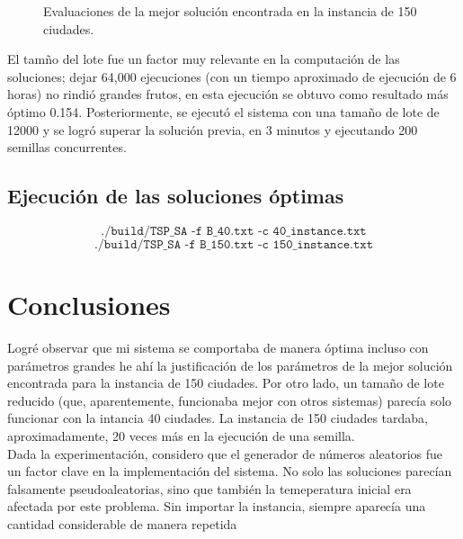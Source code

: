 \documentclass[a4paper]{report}
\begin{document}
\begin{figure}[h!tbp]
  \hspace*{-1.6cm}
  
  \caption{Evaluaciones de la mejor soluci\'on encontrada en la instancia de 150 ciudades.}
\end{figure}

El tam\~no del lote fue un factor muy relevante en la computaci\'on de las soluciones; dejar
64,000 ejecuciones (con un tiempo aproximado de ejecuci\'on de 6 horas) no rindi\'o grandes
frutos, en esta ejecuci\'on se obtuvo como resultado m\'as \'optimo 0.154. Posteriormente,
se ejecut\'o el sistema con una tama\~no de lote de 12000 y se logr\'o superar la soluci\'on
previa, en 3 minutos y ejecutando 200 semillas concurrentes.

\section{Ejecuci\'on de las soluciones \'optimas}

\[\texttt{./build/TSP\_SA -f B\_40.txt -c 40\_instance.txt}\]
\[\texttt{./build/TSP\_SA -f B\_150.txt -c 150\_instance.txt}\]

\chapter{Conclusiones}

Logr\'e observar que mi sistema se comportaba de manera \'optima incluso con par\'ametros
grandes he ah\'i la justificaci\'on de los par\'ametros de la mejor soluci\'on encontrada
para la instancia de 150 ciudades. Por otro lado, un tama\~no de lote reducido (que,
aparentemente, funcionaba mejor con otros sistemas) parec\'ia solo funcionar con la intancia
40 ciudades. La instancia de 150 ciudades tardaba, aproximadamente, 20 veces m\'as en la ejecuci\'on
de una semilla.\\

Dada la experimentaci\'on, considero que el generador de n\'umeros aleatorios fue un factor
clave en la implementaci\'on del sistema. No solo las soluciones parec\'ian falsamente
pseudoaleatorias, sino que tambi\'en la temeperatura inicial era afectada por este problema.
Sin importar la instancia, siempre aparec\'ia una cantidad considerable de manera repetida


{}

\end{document}

